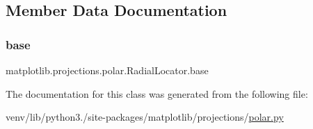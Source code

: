 \subsection{Member Data Documentation}
\mbox{\label{classmatplotlib_1_1projections_1_1polar_1_1RadialLocator_ae76f936876413504581d9d63cd80c700}} 
\subsubsection{\texorpdfstring{base}{base}}
{\footnotesize\ttfamily matplotlib.\+projections.\+polar.\+Radial\+Locator.\+base}



The documentation for this class was generated from the following file\+:\begin{DoxyCompactItemize}
\item 
venv/lib/python3./site-\/packages/matplotlib/projections/\hyperlink{polar_8py}{polar.\+py}\end{DoxyCompactItemize}
